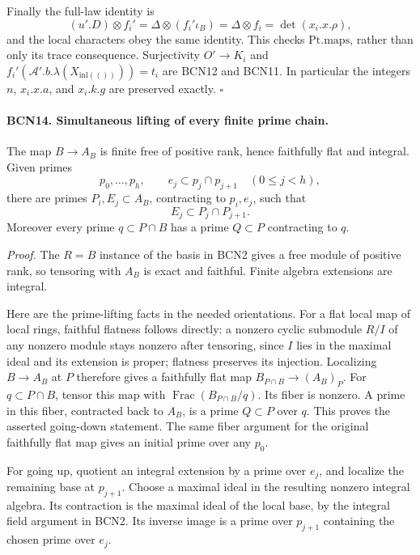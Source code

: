 Finally the full-law identity is
\[
 (u'.D)\otimes f_i'
  =\Delta\otimes(f_i'\iota_B)
  =\Delta\otimes f_i
  =\det(x_i.x.\rho),
\]
and the local characters obey the same identity.
This checks \(\mathrm{Pt.maps}\), rather than only its
trace consequence.  Surjectivity \(O'\to K_i\) and
\(f_i'(\mathcal A'.b.\lambda(X_{\mathrm{inl}(())}))=t_i\)
are BCN12 and BCN11.
In particular the integers \(n\), \(x_i.x.a\), and \(x_i.k.g\)
are preserved exactly.
\hfill\(\square\)

\paragraph{BCN14. Simultaneous lifting of every finite prime chain.}\label{claim:BCN14}
The map \(B\to A_B\) is finite free of positive rank,
hence faithfully flat and integral.
Given primes
\[
 p_0,\ldots,p_h,\qquad
 e_j\subset p_j\cap p_{j+1}\quad(0\le j<h),
\]
there are primes \(P_i,E_j\subset A_B\), contracting to
\(p_i,e_j\), such that
\[
 E_j\subset P_j\cap P_{j+1}.                                   \tag{BCN.33}
\]
Moreover every prime \(q\subset P\cap B\) has a prime
\(Q\subset P\) contracting to \(q\).

\emph{Proof.}
The \(R=B\) instance of the basis in BCN2 gives a free
module of positive rank, so tensoring with \(A_B\) is
exact and faithful.  Finite algebra extensions are integral.

Here are the prime-lifting facts in the needed orientations.
For a flat local map of local rings, faithful flatness
follows directly: a nonzero cyclic submodule \(R/I\) of
any nonzero module stays nonzero after tensoring, since
\(I\) lies in the maximal ideal and its extension is proper;
flatness preserves its injection.  Localizing \(B\to A_B\)
at \(P\) therefore gives a faithfully flat map
\(B_{P\cap B}\to(A_B)_P\).
For \(q\subset P\cap B\), tensor this map with
\(\operatorname{Frac}(B_{P\cap B}/q)\).
Its fiber is nonzero.  A prime in this fiber, contracted
back to \(A_B\), is a prime \(Q\subset P\) over \(q\).
This proves the asserted going-down statement.
The same fiber argument for the original faithfully flat
map gives an initial prime over any \(p_0\).

For going up, quotient an integral extension by a prime
over \(e_j\), and localize the remaining base at \(p_{j+1}\).
Choose a maximal ideal in the resulting nonzero integral
algebra.  Its contraction is the maximal ideal of the
local base, by the integral field argument in BCN2.
Its inverse image is a prime over \(p_{j+1}\) containing
the chosen prime over \(e_j\).

